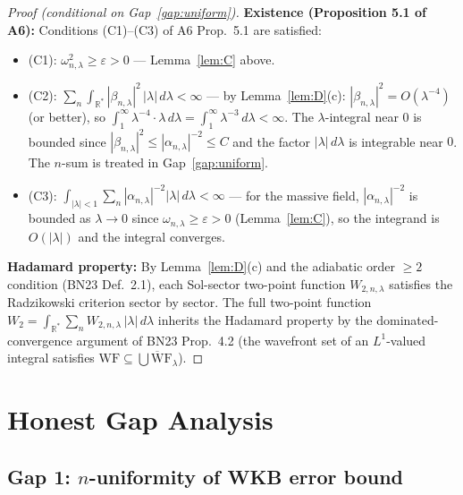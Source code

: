 \documentclass[11pt,a4paper]{article}
\theoremstyle{definition}
\newcommand{\R}{\mathbb{R}}
\newcommand{\WF}{\mathrm{WF}}
\begin{document}
\begin{proof}[Proof (conditional on Gap~\ref{gap:uniform})]
\textbf{Existence (Proposition 5.1 of A6):}
Conditions (C1)--(C3) of A6 Prop.~5.1 are satisfied:
\begin{itemize}
  \item (C1): $\omega_{n,\lambda}^2 \geq \varepsilon > 0$ — Lemma~\ref{lem:C} above.
  \item (C2): $\sum_n \int_{\R^*} |\beta_{n,\lambda}|^2\,|\lambda|\,d\lambda < \infty$
    — by Lemma~\ref{lem:D}(c): $|\beta_{n,\lambda}|^2 = O(\lambda^{-4})$
    (or better), so $\int_1^\infty \lambda^{-4} \cdot \lambda\,d\lambda = \int_1^\infty \lambda^{-3}\,d\lambda < \infty$.
    The $\lambda$-integral near $0$ is bounded since $|\beta_{n,\lambda}|^2 \leq |\alpha_{n,\lambda}|^{-2} \leq C$
    and the factor $|\lambda|\,d\lambda$ is integrable near $0$.
    The $n$-sum is treated in Gap~\ref{gap:uniform}.
  \item (C3): $\int_{|\lambda|<1} \sum_n |\alpha_{n,\lambda}|^{-2}|\lambda|\,d\lambda < \infty$
    — for the massive field, $|\alpha_{n,\lambda}|^{-2}$ is bounded as $\lambda \to 0$
    since $\omega_{n,\lambda} \geq \varepsilon > 0$ (Lemma~\ref{lem:C}), so the integrand
    is $O(|\lambda|)$ and the integral converges.
\end{itemize}

\textbf{Hadamard property:}
By Lemma~\ref{lem:D}(c) and the adiabatic order $\geq 2$ condition (BN23 Def.~2.1),
each Sol-sector two-point function $W_{2,n,\lambda}$ satisfies the Radzikowski criterion
sector by sector.  The full two-point function $W_2 = \int_{\R^*} \sum_n W_{2,n,\lambda}\,|\lambda|\,d\lambda$
inherits the Hadamard property by the dominated-convergence argument of BN23 Prop.~4.2
(the wavefront set of an $L^1$-valued integral satisfies $\WF \subseteq \overline{\bigcup \WF_\lambda}$).
\end{proof}

\section{Honest Gap Analysis}
\label{sec:gaps}

\subsection{Gap 1: $n$-uniformity of WKB error bound}
\end{document}
